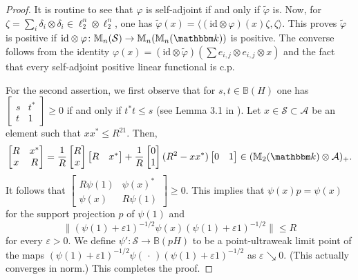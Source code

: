 \documentclass[12pt]{amsart}
\theoremstyle{definition}
\begin{document}
\begin{proof}
It is routine to see that ${\varphi}$ is self-adjoint if and only if $\tilde{\varphi}$ is.
Now, for $\zeta=\sum_i \delta_i\otimes\delta_i\in\ell_2^n\otimes\ell_2^n$,
one has $\tilde{\varphi}(x)={\mathopen{\langle}{({\mathrm{id}}\otimes{\varphi})(x)\zeta,\zeta}\mathclose{\rangle}}$.
This proves $\tilde{\varphi}$ is positive
if ${\mathrm{id}}\otimes{\varphi}\colon {{\mathbb M}}_n({{\mathcal S}})\to{{\mathbb M}}_n({{\mathbb M}}_n({{\mathbbm k}}))$ is positive.
The converse follows from the identity
${\varphi}(x)=({\mathrm{id}}\otimes\tilde{\varphi})(\sum e_{i,j}\otimes e_{i,j}\otimes x)$
and the fact that every self-adjoint positive linear functional is c.p.

For the second assertion, we first observe that for
$s,t\in{{\mathbb B}}({H})$ one has
$\left[\begin{smallmatrix} s & t^* \\ t & 1\end{smallmatrix}\right]\geq0$
if and only if $t^*t\le s$ (see Lemma 3.1 in \cite{paulsen}).
Let $x \in {{\mathcal S}}\subset{{\mathcal A}}$ be an element such that $xx^*\le R^21$.
Then,
\[
\begin{bmatrix} R & x^* \\ x & R\end{bmatrix}
=\frac{1}{R}\begin{bmatrix} R \\ x \end{bmatrix}
 \begin{bmatrix} R & x^* \end{bmatrix}
 +\frac{1}{R}\begin{bmatrix} 0 \\ 1 \end{bmatrix}
  (R^2-xx^*)
 \begin{bmatrix} 0 & 1 \end{bmatrix}\in({{\mathbb M}}_2({{\mathbbm k}})\otimes{{\mathcal A}})_+.
\]
It follows that $\left[\begin{smallmatrix} R\psi(1) & \psi(x)^* \\ \psi(x) & R\psi(1)\end{smallmatrix}\right]\geq0$.
This implies that $\psi(x)p=\psi(x)$ for the support projection $p$ of $\psi(1)$ and
\[
\|(\psi(1)+{\varepsilon}1)^{-1/2}\psi(x)(\psi(1)+{\varepsilon}1)^{-1/2}\|\le R
\]
for every ${\varepsilon}>0$.
We define $\psi'\colon{{\mathcal S}}\to{{\mathbb B}}(p{H})$ to be a point-ultraweak limit point of
the maps
$(\psi(1)+{\varepsilon}1)^{-1/2}\psi(\,\cdot\,)(\psi(1)+{\varepsilon}1)^{-1/2}$ as ${\varepsilon}\searrow0$.
(This actually converges in norm.)
This completes the proof.
\end{proof}
\end{document}
